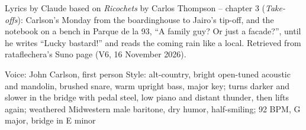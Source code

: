 \begin{notes}
Lyrics by Claude based on \emph{Ricochets} by Carlos Thompson -- chapter 3 (\emph{Take-offs}): Carlson's Monday from the boardinghouse to Jairo's tip-off, and the notebook on a bench in Parque de la 93, ``A family guy? Or just a facade?'', until he writes ``Lucky bastard!'' and reads the coming rain like a local. Retrieved from rataflechera's Suno page (V6, 16 November 2026).
\end{notes}
\begin{style}
Voice: John Carlson, first person
Style: alt-country, bright open-tuned acoustic and mandolin, brushed snare, warm upright bass, major key; turns darker and slower in the bridge with pedal steel, low piano and distant thunder, then lifts again; weathered Midwestern male baritone, dry humor, half-smiling; 92 BPM, G major, bridge in E minor
\end{style}
